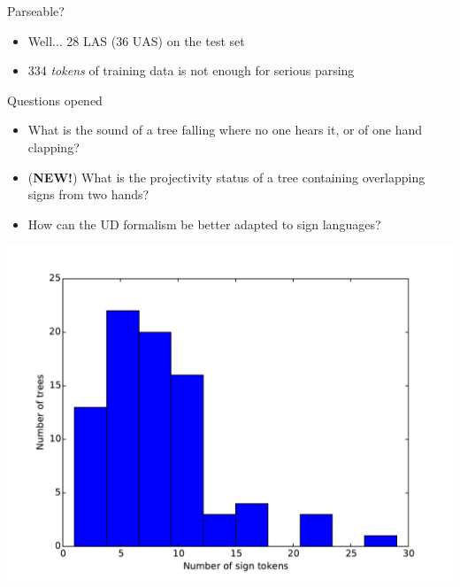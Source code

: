 \documentclass[final]{beamer}
\begin{document}
\begin{frame}{}
\begin{columns}[t]
\begin{column}{.48\linewidth}
            \begin{block}{\large Parseable?}
                \begin{itemize}
                    \item Well... 28 LAS (36 UAS) on the test set
                    \item 334 \emph{tokens} of training data is not enough for
                        serious parsing
                \end{itemize}
            \end{block}


            \begin{block}{\large Questions opened}
                \begin{itemize}
                    \item What is the sound of a tree falling where no one
                        hears it, or of one hand clapping?
                    \item (\textbf{NEW!}) What is the projectivity status of
                        a tree containing overlapping signs from two hands?
                    \item How can the UD formalism be better adapted to sign
                        languages?
                \end{itemize}
            \end{block}



           \begin{center}
            \includegraphics[width=1.0\linewidth]{../nodalida2017/treesizes.pdf}
           \end{center}



\end{column}
\end{columns}
\end{frame}
\end{document}
